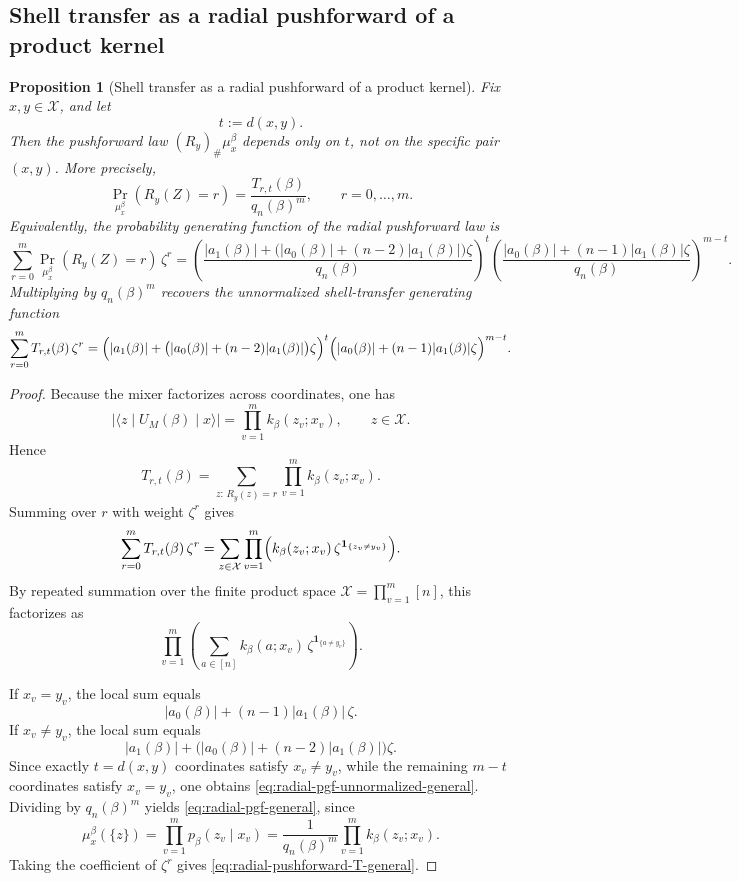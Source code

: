 \documentclass[a4paper,onecolumn,11pt,unpublished]{quantumarticle}
\newtheorem{proposition}[theorem]{Proposition}
\theoremstyle{remark}
\begin{document}
\subsection{Shell transfer as a radial pushforward of a product kernel}

\begin{proposition}[Shell transfer as a radial pushforward of a product kernel]
\label{prop:shell-transfer-product-pushforward}
Fix \(x,y\in \mathcal X\), and let
\[
t:=d(x,y).
\]
Then the pushforward law \((R_y)_\#\mu_x^\beta\) depends only on \(t\), not on
the specific pair \((x,y)\). More precisely,
\begin{equation}
\label{eq:radial-pushforward-T-general}
\Pr_{\mu_x^\beta}(R_y(Z)=r)
=
\frac{T_{r,t}(\beta)}{q_n(\beta)^m},
\qquad r=0,\dots,m.
\end{equation}
Equivalently, the probability generating function of the radial pushforward law is
\begin{equation}
\label{eq:radial-pgf-general}
\sum_{r=0}^{m}
\Pr_{\mu_x^\beta}(R_y(Z)=r)\,\zeta^r
=
\left(
\frac{|a_1(\beta)|+\bigl(|a_0(\beta)|+(n-2)|a_1(\beta)|\bigr)\zeta}
     {q_n(\beta)}
\right)^t
\left(
\frac{|a_0(\beta)|+(n-1)|a_1(\beta)|\zeta}
     {q_n(\beta)}
\right)^{m-t}.
\end{equation}
Multiplying by \(q_n(\beta)^m\) recovers the unnormalized shell-transfer
generating function
\begin{equation}
\label{eq:radial-pgf-unnormalized-general}
\sum_{r=0}^{m} T_{r,t}(\beta)\,\zeta^r
=
\Bigl(|a_1(\beta)| + \bigl(|a_0(\beta)|+(n-2)|a_1(\beta)|\bigr)\zeta\Bigr)^t
\Bigl(|a_0(\beta)| + (n-1)|a_1(\beta)|\zeta\Bigr)^{m-t}.
\end{equation}
\end{proposition}

\begin{proof}
Because the mixer factorizes across coordinates, one has
\[
\bigl|\langle z\mid U_M(\beta)\mid x\rangle\bigr|
=
\prod_{v=1}^{m} k_\beta(z_v;x_v),
\qquad z\in \mathcal X.
\]
Hence
\[
T_{r,t}(\beta)
=
\sum_{z:\,R_y(z)=r}\prod_{v=1}^{m} k_\beta(z_v;x_v).
\]
Summing over \(r\) with weight \(\zeta^r\) gives
\[
\sum_{r=0}^{m} T_{r,t}(\beta)\,\zeta^r
=
\sum_{z\in \mathcal X}
\prod_{v=1}^{m}
\Bigl(
k_\beta(z_v;x_v)\,\zeta^{\mathbf 1_{\{z_v\neq y_v\}}}
\Bigr).
\]
By repeated summation over the finite product space \(\mathcal X=\prod_{v=1}^{m}[n]\),
this factorizes as
\[
\prod_{v=1}^{m}
\left(
\sum_{a\in[n]} k_\beta(a;x_v)\,\zeta^{\mathbf 1_{\{a\neq y_v\}}}
\right).
\]

If \(x_v=y_v\), the local sum equals
\[
|a_0(\beta)|+(n-1)|a_1(\beta)|\,\zeta.
\]
If \(x_v\neq y_v\), the local sum equals
\[
|a_1(\beta)|
+
\bigl(|a_0(\beta)|+(n-2)|a_1(\beta)|\bigr)\zeta.
\]
Since exactly \(t=d(x,y)\) coordinates satisfy \(x_v\neq y_v\), while the
remaining \(m-t\) coordinates satisfy \(x_v=y_v\), one obtains
\eqref{eq:radial-pgf-unnormalized-general}. Dividing by \(q_n(\beta)^m\) yields
\eqref{eq:radial-pgf-general}, since
\[
\mu_x^\beta(\{z\})
=
\prod_{v=1}^{m} p_\beta(z_v\mid x_v)
=
\frac{1}{q_n(\beta)^m}
\prod_{v=1}^{m} k_\beta(z_v;x_v).
\]
Taking the coefficient of \(\zeta^r\) gives
\eqref{eq:radial-pushforward-T-general}.
\end{proof}
\end{document}
